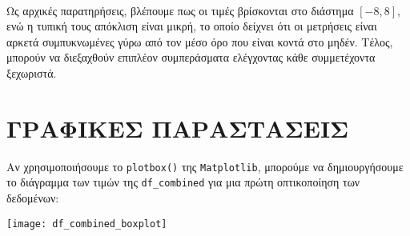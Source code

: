         \begin{table}[ht] \noindent\centering\tt
        \end{table}

        Ως αρχικές παρατηρήσεις, βλέπουμε πως οι τιμές βρίσκονται στο διάστημα \( [-8, 8]\), ενώ η τυπική τους απόκλιση είναι μικρή,
        το οποίο δείχνει ότι οι μετρήσεις είναι αρκετά συμπυκνωμένες γύρω από τον μέσο όρο που είναι κοντά στο μηδέν.
        Τέλος, μπορούν να διεξαχθούν επιπλέον συμπεράσματα ελέγχοντας κάθε συμμετέχοντα ξεχωριστά.

    \section{ΓΡΑΦΙΚΕΣ ΠΑΡΑΣΤΑΣΕΙΣ}

        Aν χρησιμοποιήσουμε το \texttt{plotbox()} της \texttt{Matplotlib}, μπορούμε να δημιουργήσουμε
        το διάγραμμα των τιμών της \verb|df_combined| για μια πρώτη οπτικοποίηση των δεδομένων:

        \begin{center}
            \texttt{[image: df\_combined\_boxplot]}
        \end{center}

